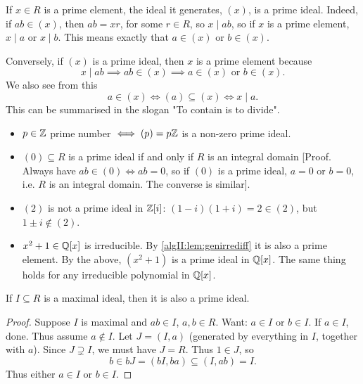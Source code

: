 \documentclass[10pt, a4paper]{article}
\begin{document}
If $x \in R$ is a prime element,
the ideal it generates,
$(x)$,
is a prime ideal.
Indeed,
if $ab \in (x)$,
then $ab = xr$,
for some $r \in R$,
so $x \mid ab$,
so if $x$ is a prime element,
$x \mid a$ or $x \mid b$.
This means exactly that $a \in (x)$ or $b \in (x)$.

Conversely,
if $(x)$ is a prime ideal,
then $x$ is a prime element because
\[
x \mid ab \implies ab \in (x) \implies a \in (x)\text{ or } b \in (x).
\]
We also see from this
\[
a \in (x) \iff (a) \subseteq (x) \iff x \mid a.
\]
This can be summarised in the slogan
"To contain is to divide".

\begin{example}\phantom{}
    \begin{itemize}[label = $-$]
        \item  $p \in \mathbb{Z}$ prime number $\iff (p) = p\mathbb{Z}$ is a non-zero prime ideal.

        \item $(0) \subseteq R$ is a prime ideal if and only if $R$ is an integral domain
        [Proof.
        Always have $ab \in (0) \iff ab = 0$,
        so if $(0)$ is a prime ideal,
        $a = 0$ or $b = 0$,
        i.e. $R$ is an integral domain.
        The converse is similar].

        \item $(2)$ is not a prime ideal in $\mathbb{Z}[i]$:
        $(1 - i)(1 + i) = 2 \in (2)$,
        but $1 \pm i \notin (2)$.

        \item $x ^ 2 + 1 \in \mathbb{Q}[x]$ is irreducible.
        By \autoref{algII:lem:genirrediff} it is also a prime element.
        By the above,
        $(x ^ 2 + 1)$ is a prime ideal in $\mathbb{Q}[x]$.
        The same thing holds for any irreducible polynomial in $\mathbb{Q}[x]$.
    \end{itemize}
\end{example}

\begin{lemma}
    If $I \subseteq R$ is a maximal ideal,
    then it is also a prime ideal.

    \begin{proof}
        Suppose $I$ is maximal and $ab \in I$,
        $a, b \in R$.
        Want:
        $a \in I$ or $b \in I$.
        If $a \in I$,
        done.
        Thus assume $a \notin I$.
        Let $J = (I, a)$
        (generated by everything in $I$,
        together with $a$).
        Since $J \supsetneq I$,
        we must have $J = R$.
        Thus $1 \in J$,
        so
        \[
        b \in bJ = (bI, ba) \subseteq (I, ab) = I.
        \]
        Thus either $a \in I$ or $b \in I$.
    \end{proof}
\end{lemma}
\end{document}
